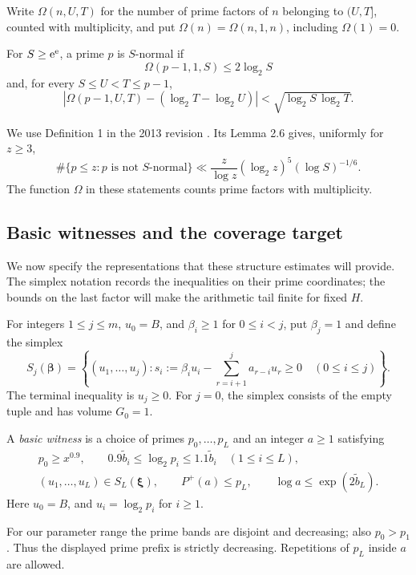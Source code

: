 Write \(\Omega(n,U,T)\) for the number of prime factors of \(n\)
belonging to \((U,T]\), counted with multiplicity, and put
\(\Omega(n)=\Omega(n,1,n)\), including \(\Omega(1)=0\).

\begin{definition}\label{def:normal}
For \(S\ge\mathrm e^\mathrm e\), a prime \(p\) is \(S\)-normal if
\[
 \Omega(p-1,1,S)\le2\log_2S
\]
and, for every \(S\le U<T\le p-1\),
\[
 \left|\Omega(p-1,U,T)-(\log_2T-\log_2U)\right|
 <\sqrt{\log_2S\,\log_2T}.
\]
\end{definition}
We use Definition 1 in the 2013 revision \cite{FordTotients2013}.
Its Lemma 2.6 gives, uniformly for \(z\ge3\),
\begin{equation}\label{eq:normal-primes}
 \#\{p\le z:p\text{ is not }S\text{-normal}\}
 \ll \frac{z}{\log z}(\log_2z)^5(\log S)^{-1/6}.
\end{equation}
The function \(\Omega\) in these statements counts prime factors with
multiplicity.

\subsection{Basic witnesses and the coverage target}

We now specify the representations that these structure estimates will
provide. The simplex notation records the inequalities on their prime
coordinates; the bounds on the last factor will make the arithmetic
tail finite for fixed \(H\).

For integers \(1\le j\le m\), \(u_0=B\), and \(\beta_i\ge1\) for \(0\le i<j\),
put \(\beta_j=1\) and define the simplex
\[
 S_j(\boldsymbol\beta)=
 \left\{(u_1,\ldots,u_j):
 s_i:=\beta_i u_i-\sum_{r=i+1}^j a_{r-i}u_r\ge0
 \quad(0\le i\le j)\right\}.
\]
The terminal inequality is \(u_j\ge0\).
For \(j=0\), the simplex consists of the empty tuple and has volume
\(G_0=1\).

\begin{definition}\label{def:basic}
A \emph{basic witness} is a choice of primes \(p_0,\ldots,p_L\)
and an integer \(a\ge1\) satisfying
\begin{equation}\label{eq:basic}
 \begin{gathered}
 p_0\ge x^{0.9},\qquad
 0.9\widetilde b_i\le\log_2p_i\le1.1\widetilde b_i
 \quad(1\le i\le L),\\
 (u_1,\ldots,u_L)\in S_L(\boldsymbol\xi),\qquad
 P^+(a)\le p_L,\qquad \log a\le\exp(2\widetilde b_L).
 \end{gathered}
\end{equation}
Here \(u_0=B\), and \(u_i=\log_2p_i\) for \(i\ge1\).
\end{definition}
For our parameter range the prime bands are disjoint and decreasing;
also \(p_0>p_1\).  Thus the displayed prime prefix is strictly
decreasing.  Repetitions of \(p_L\) inside \(a\) are allowed.

